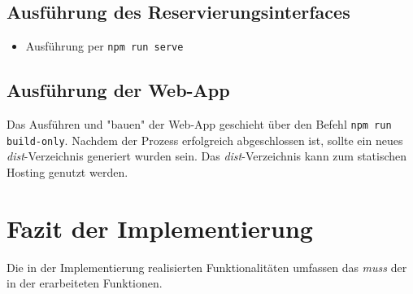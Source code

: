 \subsection{Ausführung des Reservierungsinterfaces}
\begin{itemize}
  \item Ausführung per \lstinline{npm run serve}
\end{itemize}

\subsection{Ausführung der Web-App}
Das Ausführen und "bauen" der Web-App geschieht über den Befehl \lstinline{npm run build-only}.
Nachdem der Prozess erfolgreich abgeschlossen ist, sollte ein neues \textit{dist}-Verzeichnis
generiert wurden sein. Das \textit{dist}-Verzeichnis kann zum statischen Hosting genutzt werden.


\section{Fazit der Implementierung}

Die in der Implementierung realisierten Funktionalitäten umfassen das \textit{muss} der in der
 erarbeiteten Funktionen.
